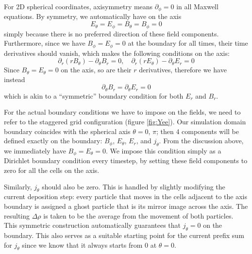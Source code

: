 For 2D spherical coordinates, axisymmetry means $\partial_{\phi} = 0$ in all
Maxwell equations. By symmetry, we automatically have on the axis
\begin{equation}
  E_{\theta} = E_{\phi} = B_{\theta} = B_{\phi} = 0
\end{equation}
simply because there is no preferred direction of these field components.
Furthermore, since we have $B_{\phi} = E_{\phi} = 0$ at the boundary for all
times, their time derivatives should vanish, which makes the following
conditions on the axis:
\begin{equation}
  \partial_r(rB_{\theta}) - \partial_{\theta}B_r = 0,\quad \partial_r(rE_{\theta}) - \partial_{\theta}E_{r} = 0
\end{equation}
Since $B_{\theta} = E_{\theta} = 0$ on the axis, so are their $r$
derivatives, therefore we have instead
\begin{equation}
  \partial_{\theta}B_r = \partial_{\theta}E_r = 0
\end{equation}
which is akin to a ``symmetric'' boundary condition for both $E_r$ and $B_r$.

For the actual boundary conditions we have to impose on the fields, we need to
refer to the staggered grid configuration (figure \ref{fig:Yee}). Our simulation
domain boundary coincides with the spherical axis $\theta = 0$, $\pi$; then 4
components will be defined exactly on the boundary: $B_{\phi}$, $E_{\theta}$,
$E_r$, and $j_{\theta}$. From the discussion above, we immediately have
$B_{\phi} = E_{\theta} = 0$. We impose this condition simply as a Dirichlet
boundary condition every timestep, by setting these field components to zero for
all the cells on the axis.

Similarly, $j_{\theta}$ should also be zero. This is handled by slightly
modifying the current deposition step: every particle that moves in the cells
adjacent to the axis boundary is assigned a ghost particle that is its mirror
image across the axis. The resulting $\Delta \rho$ is taken to be the average
from the movement of both particles. This symmetric construction automatically
guarantees that $j_{\theta} = 0$ on the boundary. This also serves as a suitable
starting point for the current prefix sum for $j_{\theta}$ since we know that it
always starts from 0 at $\theta = 0$.

